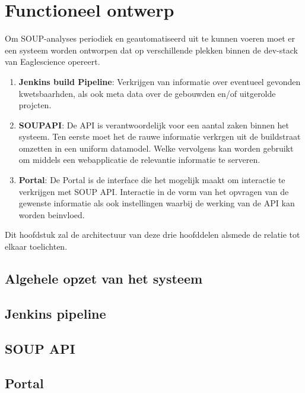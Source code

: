 \chapter{Functioneel ontwerp}\label{ch:impl-architectuur}

Om SOUP-analyses periodiek en geautomatiseerd uit te kunnen voeren moet er een systeem worden ontworpen dat op verschillende plekken binnen de dev-stack van Eaglescience opereert.

\begin{enumerate}
    \item \textbf{Jenkins build Pipeline}: Verkrijgen van informatie over eventueel gevonden kwetsbaarhden, als ook meta data over de gebouwden en/of uitgerolde projcten.
    \item \textbf{SOUPAPI}: De API is verantwoordelijk voor een aantal zaken binnen het systeem. Ten eerste moet het de rauwe informatie verkrgen uit de buildstraat omzetten in een uniform datamodel. Welke vervolgens kan worden gebruikt om middels een webapplicatie de relevantie informatie te serveren.
    \item \textbf{Portal}: De Portal is de interface die het mogelijk maakt om interactie te verkrijgen met SOUP API. Interactie in de vorm van het opvragen van de gewenste informatie als ook instellingen waarbij de werking van de API kan worden beinvloed.
\end{enumerate}
Dit hoofdstuk zal de architectuur van deze drie hoofddelen alsmede de relatie tot elkaar toelichten.


\section{Algehele opzet van het systeem}\label{sec:algehele-opzet-van-het-systeem}


\section{Jenkins pipeline}\label{sec:jenkins-pipeline}

\section{SOUP API}\label{sec:soup-api}

\section{Portal}\label{sec:portal}
